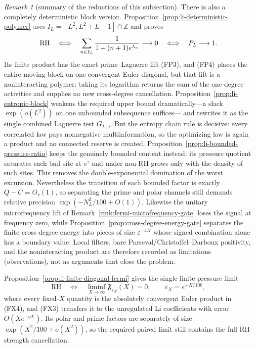 \documentclass[11pt]{amsart}
\theoremstyle{definition}
\theoremstyle{remark}
\newtheorem{remark}[theorem]{Remark}
\theoremstyle{definition}
\newcommand{\RH}{\mathrm{RH}}
\begin{document}
\begin{remark}[summary of the reductions of this subsection]
There is also a completely deterministic block version.
Proposition~\ref{prop:li-deterministic-polymer} uses
$I_L=[L^2,L^2+L-1]\cap\mathbb Z$ and proves
\[
 \RH\quad\Longleftrightarrow\quad
 \sum_{n\in I_L}{1\over1+(n+1)e^{\lambda_n}}\longrightarrow0
 \quad\Longleftrightarrow\quad P_L\longrightarrow1.
\]
Its finite product has the exact prime--Laguerre lift (FP3), and (FP4)
places the entire moving block on one convergent Euler diagonal, but that lift
is a noninteracting polymer: taking its logarithm returns the sum of the
one-degree activities and supplies no new cross-degree cancellation.
Proposition~\ref{prop:li-entropic-block} weakens the required upper bound
dramatically---a slack $\exp(o(L^2))$ on one unbounded subsequence suffices---
and rewrites it as the single combined Laguerre test $G_{L,q}$.  But the
entropy chain rule is decisive: every correlated law pays nonnegative
multiinformation, so the optimizing law is again a product and no connected
reserve is created.
Proposition~\ref{prop:li-bounded-pressure-ratio} keeps the genuinely bounded
content instead: its pressure quotient saturates each bad site at $e^\tau$
and under non-RH grows only with the density of such sites.  This removes the
double-exponential domination of the worst excursion.  Nevertheless the
transition of each bounded factor is exactly $Q-C=O_\tau(1)$, so separating
the prime and polar channels still demands relative precision
$\exp(-N_L^2/100+O(1))$.
Likewise the unitary microfrequency lift of
Remark~\ref{rmk:fermi-microfrequency-gate} loses the signal at frequency
zero, while Proposition~\ref{prop:cross-degree-energy-gate} separates the
finite cross-degree energy into pieces of size $\varepsilon^{-4N}$ whose
signed combination alone has a boundary value.  Local filters, bare
Parseval/Christoffel--Darboux positivity, and the noninteracting product are
therefore recorded as limitations (observations), not as arguments that
close the problem.

Proposition~\ref{prop:li-finite-diagonal-fermi} gives the single finite
pressure limit
\[
 \boxed{\quad\RH\quad\Longleftrightarrow\quad
 \liminf_{X\to\infty}\mathfrak F_{\varepsilon_X}(X)=0,
 \qquad \varepsilon_X=e^{-X/100},\quad}                  \tag{FX5}
\]
where every fixed-$X$ quantity is the absolutely convergent Euler product
in (FX4), and (FX3) transfers it to the unregulated Li coefficients with
error $O(Xe^{-\eta X})$.  Its polar and prime factors are separately of
size $\exp(X^2/100+o(X^2))$, so the required paired limit still contains
the full RH-strength cancellation.


\end{remark}
\end{document}
